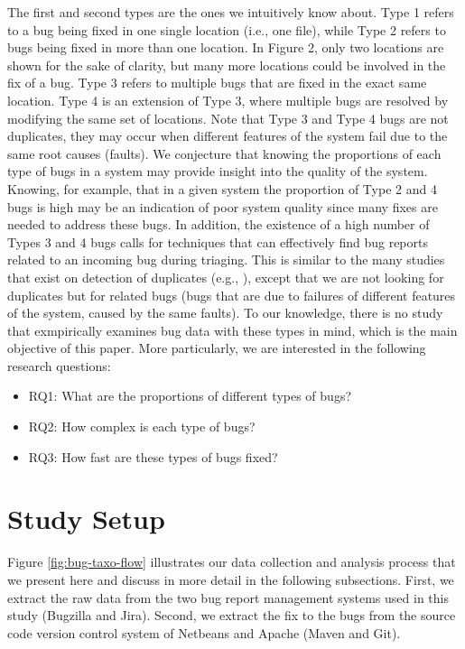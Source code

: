 The first and second types are the ones we intuitively know
about. Type 1 refers to a bug being fixed in one single location
(i.e., one file), while Type 2 refers to bugs being fixed in more
than one location. In Figure 2, only two locations are shown
for the sake of clarity, but many more locations could be
involved in the fix of a bug. Type 3 refers to multiple bugs that
are fixed in the exact same location. Type 4 is an extension of
Type 3, where multiple bugs are resolved by modifying the
same set of locations. Note that Type 3 and Type 4 bugs are
not duplicates, they may occur when different features of the
system fail due to the same root causes (faults).
We conjecture that knowing the proportions of each type
of bugs in a system may provide insight into the quality of the
system. Knowing, for example, that in a given system the
proportion of Type 2 and 4 bugs is high may be an indication
of poor system quality since many fixes are needed to address
these bugs. In addition, the existence of a high number of
Types 3 and 4 bugs calls for techniques that can effectively
find bug reports related to an incoming bug during triaging.
This is similar to the many studies that exist on detection of
duplicates (e.g., \cite{Runeson2007,Sun2010,Nguyen2012}), except that we are not looking for
duplicates but for related bugs (bugs that are due to failures of
different features of the system, caused by the same faults). To
our knowledge, there is no study that exmpirically examines
bug data with these types in mind, which is the main objective
of this paper. More particularly, we are interested in the
following research questions:

\begin{itemize}
	\item RQ1: What are the proportions of different types of bugs?
	\item RQ2: How complex is each type of bugs?
	\item RQ3: How fast are these types of bugs fixed?
\end{itemize}


\section{Study Setup}

Figure \ref{fig:bug-taxo-flow} illustrates our data collection and analysis
process that we present here and discuss in more detail in the
following subsections. First, we extract the raw data from the
two bug report management systems used in this study
(Bugzilla and Jira). Second, we extract the fix to the bugs
from the source code version control system of Netbeans and
Apache (Maven and Git).

